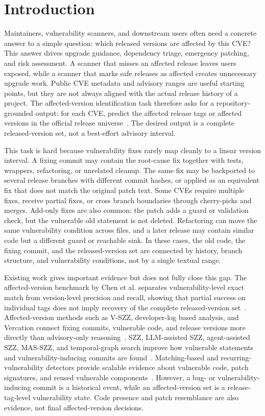 \section{Introduction}

Maintainers, vulnerability scanners, and downstream users often need a concrete answer to a simple question: which released versions are affected by this CVE? This answer drives upgrade guidance, dependency triage, emergency patching, and risk assessment. A scanner that misses an affected release leaves users exposed, while a scanner that marks safe releases as affected creates unnecessary upgrade work. Public CVE metadata and advisory ranges are useful starting points, but they are not always aligned with the actual release history of a project. The affected-version identification task therefore asks for a repository-grounded output: for each CVE, predict the affected release tags or affected versions in the official release universe~\cite{howfar2025}. The desired output is a complete released-version set, not a best-effort advisory interval.

This task is hard because vulnerability fixes rarely map cleanly to a linear version interval. A fixing commit may contain the root-cause fix together with tests, wrappers, refactoring, or unrelated cleanup. The same fix may be backported to several release branches with different commit hashes, or applied as an equivalent fix that does not match the original patch text. Some CVEs require multiple fixes, receive partial fixes, or cross branch boundaries through cherry-picks and merges. Add-only fixes are also common: the patch adds a guard or validation check, but the vulnerable old statement is not deleted. Refactoring can move the same vulnerability condition across files, and a later release may contain similar code but a different guard or reachable sink. In these cases, the old code, the fixing commit, and the released-version set are connected by history, branch structure, and vulnerability conditions, not by a single textual range.

Existing work gives important evidence but does not fully close this gap. The affected-version benchmark by Chen et al. separates vulnerability-level exact match from version-level precision and recall, showing that partial success on individual tags does not imply recovery of the complete released-version set~\cite{howfar2025}. Affected-version methods such as V-SZZ, developer-log based analysis, and Vercation connect fixing commits, vulnerable code, and release versions more directly than advisory-only reasoning~\cite{vszz2022,tdsc2024,vercation2026}. SZZ, LLM-assisted SZZ, agent-assisted SZZ, MAS-SZZ, and temporal-graph search improve how vulnerable statements and vulnerability-inducing commits are found~\cite{llm4szz2025,agentszz2026,masszz2026,beyondblame2026}. Matching-based and recurring-vulnerability detectors provide scalable evidence about vulnerable code, patch signatures, and reused vulnerable components~\cite{fire2024,movery2022,vuddy2017,vulture2025}. However, a bug- or vulnerability-inducing commit is a historical event, while an affected-version set is a release-tag-level vulnerability state. Code presence and patch resemblance are also evidence, not final affected-version decisions.

